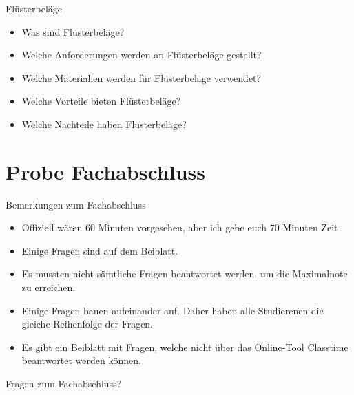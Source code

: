 \begin{frame}{Flüsterbeläge}
    \begin{itemize}
        \item[\textbullet] Was sind Flüsterbeläge?
        \item[\textbullet] Welche Anforderungen werden an Flüsterbeläge gestellt?
        \item[\textbullet] Welche Materialien werden für Flüsterbeläge verwendet?
        \item[\textbullet] Welche Vorteile bieten Flüsterbeläge?
        \item[\textbullet] Welche Nachteile haben Flüsterbeläge?
    \end{itemize}
\end{frame}



\section{Probe Fachabschluss}
\BlueSectionSlide


\begin{frame}{Bemerkungen zum Fachabschluss}
    \begin{itemize}
        \item[\textbullet] Offiziell wären 60 Minuten vorgesehen, aber ich gebe euch 70 Minuten Zeit
        \item[\textbullet] Einige Fragen sind auf dem Beiblatt. 
        \item[\textbullet] Es mussten nicht sämtliche Fragen beantwortet werden, um die Maximalnote zu erreichen. 
        \item[\textbullet] Einige Fragen bauen aufeinander auf. Daher haben alle Studierenen die gleiche Reihenfolge der Fragen. 
        \item[\textbullet] Es gibt ein Beiblatt mit Fragen, welche nicht über das Online-Tool Classtime beantwortet werden können.
    \end{itemize}

\end{frame}

\begin{frame}{Fragen zum Fachabschluss?}

\end{frame}






